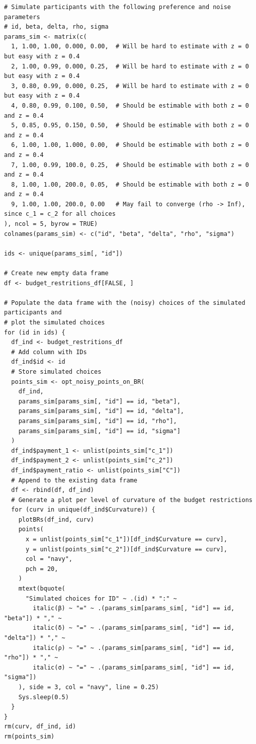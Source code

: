 \documentclass[11pt, a4paper, oneside]{article}
\theoremstyle{Plain}
\theoremstyle{Definition}
\theoremstyle{Remark}
\begin{document}
\begin{appendix}
\begin{lstlisting}
# Simulate participants with the following preference and noise parameters
# id, beta, delta, rho, sigma
params_sim <- matrix(c(
  1, 1.00, 1.00, 0.000, 0.00,  # Will be hard to estimate with z = 0 but easy with z = 0.4
  2, 1.00, 0.99, 0.000, 0.25,  # Will be hard to estimate with z = 0 but easy with z = 0.4
  3, 0.80, 0.99, 0.000, 0.25,  # Will be hard to estimate with z = 0 but easy with z = 0.4
  4, 0.80, 0.99, 0.100, 0.50,  # Should be estimable with both z = 0 and z = 0.4
  5, 0.85, 0.95, 0.150, 0.50,  # Should be estimable with both z = 0 and z = 0.4
  6, 1.00, 1.00, 1.000, 0.00,  # Should be estimable with both z = 0 and z = 0.4
  7, 1.00, 0.99, 100.0, 0.25,  # Should be estimable with both z = 0 and z = 0.4
  8, 1.00, 1.00, 200.0, 0.05,  # Should be estimable with both z = 0 and z = 0.4
  9, 1.00, 1.00, 200.0, 0.00   # May fail to converge (rho -> Inf), since c_1 = c_2 for all choices
), ncol = 5, byrow = TRUE)
colnames(params_sim) <- c("id", "beta", "delta", "rho", "sigma")

ids <- unique(params_sim[, "id"])

# Create new empty data frame
df <- budget_restritions_df[FALSE, ]

# Populate the data frame with the (noisy) choices of the simulated participants and
# plot the simulated choices
for (id in ids) {
  df_ind <- budget_restritions_df
  # Add column with IDs
  df_ind$id <- id
  # Store simulated choices
  points_sim <- opt_noisy_points_on_BR(
    df_ind,
    params_sim[params_sim[, "id"] == id, "beta"],
    params_sim[params_sim[, "id"] == id, "delta"],
    params_sim[params_sim[, "id"] == id, "rho"],
    params_sim[params_sim[, "id"] == id, "sigma"]
  )
  df_ind$payment_1 <- unlist(points_sim["c_1"])
  df_ind$payment_2 <- unlist(points_sim["c_2"])
  df_ind$payment_ratio <- unlist(points_sim["C"])
  # Append to the existing data frame
  df <- rbind(df, df_ind)
  # Generate a plot per level of curvature of the budget restrictions
  for (curv in unique(df_ind$Curvature)) {
    plotBRs(df_ind, curv)
    points(
      x = unlist(points_sim["c_1"])[df_ind$Curvature == curv],
      y = unlist(points_sim["c_2"])[df_ind$Curvature == curv],
      col = "navy",
      pch = 20,
    )
    mtext(bquote(
      "Simulated choices for ID" ~ .(id) * ":" ~
        italic(β) ~ "=" ~ .(params_sim[params_sim[, "id"] == id, "beta"]) * "," ~
        italic(δ) ~ "=" ~ .(params_sim[params_sim[, "id"] == id, "delta"]) * "," ~
        italic(ρ) ~ "=" ~ .(params_sim[params_sim[, "id"] == id, "rho"]) * "," ~
        italic(σ) ~ "=" ~ .(params_sim[params_sim[, "id"] == id, "sigma"])
    ), side = 3, col = "navy", line = 0.25)
    Sys.sleep(0.5)
  }
}
rm(curv, df_ind, id)
rm(points_sim)





\end{lstlisting}
\end{appendix}
\end{document}
